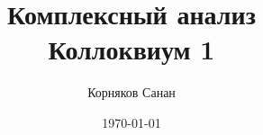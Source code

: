 \documentclass[a4paper, 12pt]{article}
\title{\textbf{Комплексный анализ} \\
	\large \vspace{10cm}\textbf{Коллоквиум 1}}
\date{\vspace{10cm}\today}
\author{Корняков Санан}
\affil{БПМИ223}
\begin{document}
\renewcommand{\contentsname}{Оглавление}
\maketitle
\newpage
\tableofcontents


% 
\end{document}
